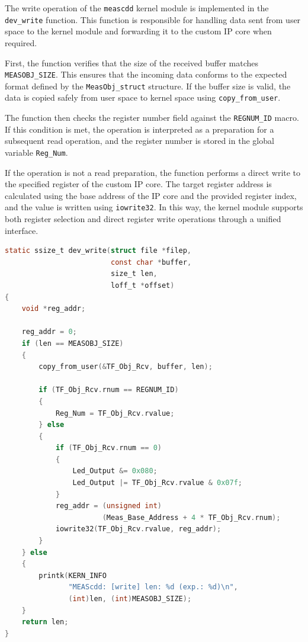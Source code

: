 The write operation of the \texttt{meascdd} kernel module is implemented in the \texttt{dev\_write} function. This function is responsible for handling data sent from user space to the kernel module and forwarding it to the custom IP core when required.

First, the function verifies that the size of the received buffer matches \texttt{MEASOBJ\_SIZE}. This ensures that the incoming data conforms to the expected format defined by the \texttt{MeasObj\_struct} structure. If the buffer size is valid, the data is copied safely from user space to kernel space using \texttt{copy\_from\_user}.

The function then checks the register number field against the \texttt{REGNUM\_ID} macro. If this condition is met, the operation is interpreted as a preparation for a subsequent read operation, and the register number is stored in the global variable \texttt{Reg\_Num}.

If the operation is not a read preparation, the function performs a direct write to the specified register of the custom IP core. The target register address is calculated using the base address of the IP core and the provided register index, and the value is written using \texttt{iowrite32}. In this way, the kernel module supports both register selection and direct register write operations through a unified interface.

\begin{lstlisting}[language=C,
caption={Write operation implementation of the meascdd kernel module},
label={lst:meascdd_write}]
static ssize_t dev_write(struct file *filep,
                         const char *buffer,
                         size_t len,
                         loff_t *offset)
{
    void *reg_addr;

    reg_addr = 0;
    if (len == MEASOBJ_SIZE) 
    {
        copy_from_user(&TF_Obj_Rcv, buffer, len);

        if (TF_Obj_Rcv.rnum == REGNUM_ID) 
        {
            Reg_Num = TF_Obj_Rcv.rvalue;
        } else 
        {
            if (TF_Obj_Rcv.rnum == 0) 
            {
                Led_Output &= 0x080;
                Led_Output |= TF_Obj_Rcv.rvalue & 0x07f;
            }
            reg_addr = (unsigned int)
                       (Meas_Base_Address + 4 * TF_Obj_Rcv.rnum);
            iowrite32(TF_Obj_Rcv.rvalue, reg_addr);
        }
    } else 
    {
        printk(KERN_INFO
               "MEAScdd: [write] len: %d (exp.: %d)\n",
               (int)len, (int)MEASOBJ_SIZE);
    }
    return len;
}
\end{lstlisting}

